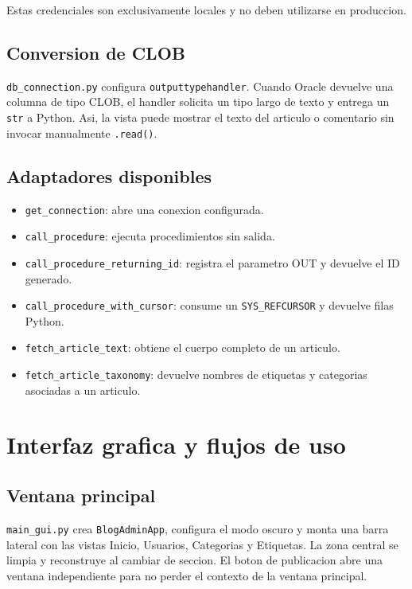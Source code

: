 \documentclass[12pt,a4paper]{article}
\begin{document}
Estas credenciales son exclusivamente locales y no deben utilizarse en
produccion.

\subsection{Conversion de CLOB}

\texttt{db\_connection.py} configura \texttt{outputtypehandler}. Cuando
Oracle devuelve una columna de tipo CLOB, el handler solicita un tipo largo de
texto y entrega un \texttt{str} a Python. Asi, la vista puede mostrar el texto
del articulo o comentario sin invocar manualmente \texttt{.read()}.

\subsection{Adaptadores disponibles}

\begin{itemize}
    \item \texttt{get\_connection}: abre una conexion configurada.
    \item \texttt{call\_procedure}: ejecuta procedimientos sin salida.
    \item \texttt{call\_procedure\_returning\_id}: registra el parametro OUT
    y devuelve el ID generado.
    \item \texttt{call\_procedure\_with\_cursor}: consume un
    \texttt{SYS\_REFCURSOR} y devuelve filas Python.
    \item \texttt{fetch\_article\_text}: obtiene el cuerpo completo de un articulo.
    \item \texttt{fetch\_article\_taxonomy}: devuelve nombres de etiquetas y
    categorias asociadas a un articulo.
\end{itemize}

\section{Interfaz grafica y flujos de uso}

\subsection{Ventana principal}

\texttt{main\_gui.py} crea \texttt{BlogAdminApp}, configura el modo oscuro y
monta una barra lateral con las vistas Inicio, Usuarios, Categorias y
Etiquetas. La zona central se limpia y reconstruye al cambiar de seccion.
El boton de publicacion abre una ventana independiente para no perder el
contexto de la ventana principal.
\end{document}
